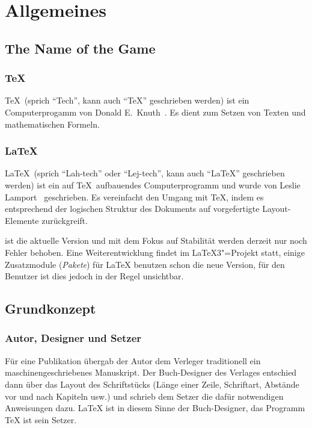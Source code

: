 \section{Allgemeines}
\label{sec:allgemeines}
 
\subsection{The Name of the Game}
 
\subsubsection{\TeX}

\TeX\ (sprich \enquote{Tech}, kann auch \enquote{TeX} geschrieben werden) ist
ein Computerprogamm von Donald E.~Knuth~\cite{texbook,schwarz}.
Es dient zum Setzen von Texten und mathematischen Formeln.
 
\subsubsection{\LaTeX}
 
\LaTeX\ (sprich \enquote{Lah-tech} oder \enquote{Lej-tech}, kann auch
\enquote{LaTeX} geschrieben werden) ist ein auf \TeX\ auf\/bauendes 
Computerprogramm und wurde von Leslie Lamport~\cite{manual,wonne} 
geschrieben.  Es vereinfacht den Umgang mit \TeX, indem es 
entsprechend der logischen Struktur des Dokuments auf vorgefertigte
Layout-Elemente zurückgreift.


\LaTeXe{} ist die aktuelle Version und mit dem Fokus auf Stabilität werden derzeit nur noch Fehler behoben. Eine Weiterentwicklung findet im \LaTeX{}3"=Projekt statt, einige Zusatzmodule (\emph{Pakete}) für \LaTeX{} benutzen schon die neue Version, für den Benutzer ist dies jedoch in der Regel unsichtbar.


\subsection{Grundkonzept}
 
\subsubsection{Autor, Designer und Setzer}
 
Für eine Publikation übergab der Autor dem Verleger
traditionell  ein maschinengeschriebenes Manuskript.  Der
Buch-Designer des Verlages entschied dann über das Layout des
Schriftstücks (Länge einer Zeile, Schriftart, Abstände vor
und nach Kapiteln usw.\@) und schrieb dem Setzer die
dafür notwendigen Anweisungen dazu.
\LaTeX{} ist in diesem Sinne der Buch-Designer, 
das Programm \TeX{} ist sein Setzer.
 
